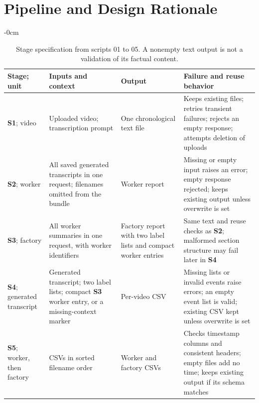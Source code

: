 \section{Pipeline and Design Rationale}
\label{sec:pipeline}

\begin{table}[!t]\begin{adjustwidth}{-\extralength}{0cm}
\caption{Stage specification from scripts 01 to 05. A nonempty text output is not a validation of its factual content.}
\label{tab:stages}\footnotesize
\begin{tabularx}{\linewidth}{@{}lLLL@{}}\toprule
Stage; unit & Inputs and context & Output & Failure and reuse behavior \\\midrule
\textbf{S1}; video & Uploaded video; transcription prompt & One chronological text file & Keeps existing files; retries transient failures; rejects an empty response; attempts deletion of uploads \\
\textbf{S2}; worker & All saved generated transcripts in one request; filenames omitted from the bundle & Worker report & Missing or empty input raises an error; empty response rejected; keeps existing output unless overwrite is set \\
\textbf{S3}; factory & All worker summaries in one request, with worker identifiers & Factory report with two label lists and compact worker entries & Same text and reuse checks as \textbf{S2}; malformed section structure may fail later in \textbf{S4} \\
\textbf{S4}; generated transcript & Generated transcript; two label lists; compact \textbf{S3} worker entry, or a missing-context marker & Per-video CSV & Missing lists or invalid events raise errors; an empty event list is valid; existing CSV kept unless overwrite is set \\
\textbf{S5}; worker, then factory & CSVs in sorted filename order & Worker and factory CSVs & Checks timestamp columns and consistent headers; empty files add no time; keeps existing output if its schema matches \\
\bottomrule\end{tabularx}
\end{adjustwidth}\end{table}

